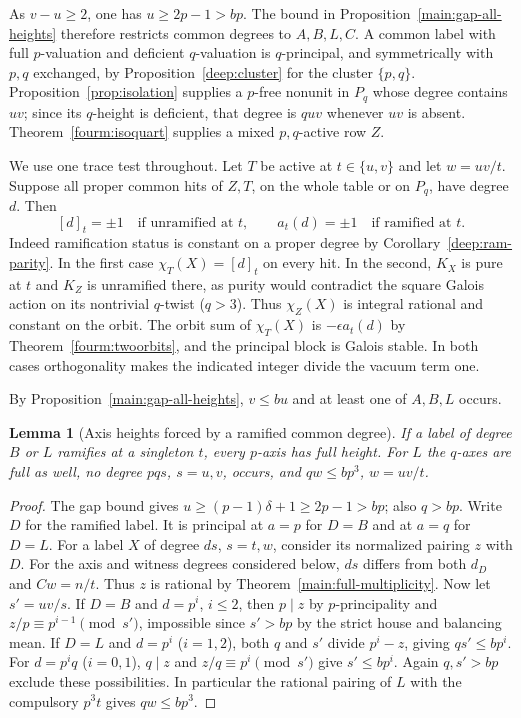 \documentclass[11pt,a4paper]{article}
\numberwithin{equation}{section}
\newtheorem{lemma}[theorem]{Lemma}
\theoremstyle{remark}
\begin{document}
As $v-u\ge2$, one has $u\ge2p-1>bp$.
The bound in Proposition~\ref{main:gap-all-heights} therefore restricts
common degrees to $A,B,L,C$. A common label with full
$p$-valuation and deficient $q$-valuation is $q$-principal, and
symmetrically with $p,q$ exchanged, by Proposition~\ref{deep:cluster}
for the cluster $\{p,q\}$.
Proposition~\ref{prop:isolation} supplies a $p$-free nonunit in $P_q$
whose degree contains $uv$; since its $q$-height is deficient, that degree
is $quv$ whenever $uv$ is absent.
Theorem~\ref{fourm:isoquart} supplies a mixed $p,q$-active row $Z$.

We use one trace test throughout. Let $T$ be active at $t\in\{u,v\}$
and let $w=uv/t$. Suppose all proper common hits of $Z,T$, on the
whole table or on $P_q$, have degree $d$. Then
\[
    [d]_t=\pm1\quad\text{if unramified at }t,\qquad
    a_t(d)=\pm1\quad\text{if ramified at }t.
\]
Indeed ramification status is constant on a proper degree by
Corollary~\ref{deep:ram-parity}. In the first case
$\chi_T(X)=[d]_t$ on every hit. In the second, $K_X$ is pure at $t$
and $K_Z$ is unramified there, as purity would contradict the
square Galois action on its nontrivial $q$-twist ($q>3$).
Thus $\chi_Z(X)$ is integral rational and constant on the orbit.
The orbit sum of $\chi_T(X)$ is $-\epsilon a_t(d)$ by
Theorem~\ref{fourm:twoorbits}, and the principal block is Galois
stable. In both cases orthogonality makes the indicated integer
divide the vacuum term one.

By Proposition~\ref{main:gap-all-heights}, $v\le bu$ and at least one
of $A,B,L$ occurs.

\begin{lemma}[Axis heights forced by a ramified common degree]\label{fam:M:12.2}
\label{fourm:ram-B-axes}
If a label of degree $B$ or $L$ ramifies at a singleton $t$, every
$p$-axis has full height. For $L$ the $q$-axes are full as well,
no degree $pqs$, $s=u,v$, occurs, and $qw\le bp^3$, $w=uv/t$.
\end{lemma}
\begin{proof}
The gap bound gives $u\ge(p-1)\delta+1\ge2p-1>bp$; also $q>bp$. Write $D$ for the ramified label. It is principal at $a=p$ for
$D=B$ and at $a=q$ for $D=L$. For a label $X$ of degree $ds$,
$s=t,w$, consider its normalized pairing $z$ with $D$.
For the axis and witness degrees considered below, $ds$ differs from
both $d_D$ and $Cw=n/t$. Thus $z$ is rational by
Theorem~\ref{main:full-multiplicity}. Now let $s'=uv/s$. If $D=B$ and $d=p^i$,
$i\le2$, then $p\mid z$ by $p$-principality and
$z/p\equiv p^{i-1}\pmod{s'}$, impossible since $s'>bp$ by
the strict house and balancing mean. If $D=L$ and $d=p^i$
($i=1,2$), both $q$ and $s'$ divide $p^i-z$, giving
$qs'\le bp^i$. For $d=p^iq$ ($i=0,1$), $q\mid z$ and
$z/q\equiv p^i\pmod{s'}$ give $s'\le bp^i$. Again $q,s'>bp$
exclude these possibilities. In particular the rational pairing of $L$
with the compulsory $p^3t$ gives $qw\le bp^3$.
\end{proof}
\end{document}
